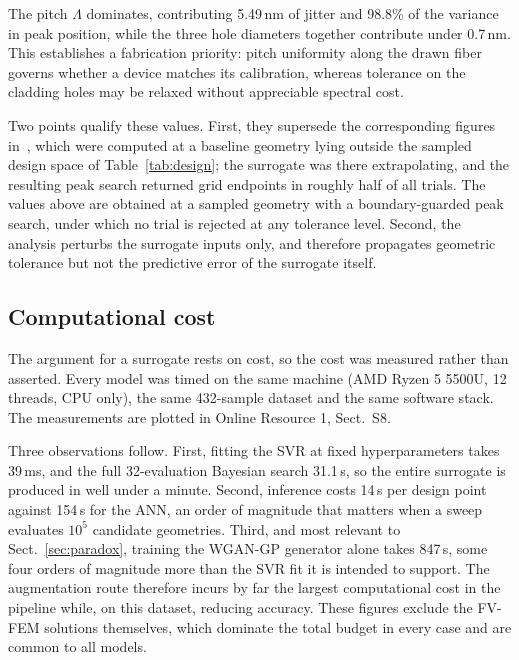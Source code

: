 \documentclass[iicol,pdflatex,sn-basic,Numbered]{sn-jnl}
\begin{document}
The pitch $\Lambda$ dominates, contributing 5.49\,nm of jitter and 98.8\% of
the variance in peak position, while the three hole diameters together
contribute under 0.7\,nm. This establishes a fabrication priority: pitch
uniformity along the drawn fiber governs whether a device matches its
calibration, whereas tolerance on the cladding holes may be relaxed without
appreciable spectral cost.

Two points qualify these values. First, they supersede the corresponding figures
in~\cite{hammoud2026siu}, which were computed at a baseline geometry lying
outside the sampled design space of Table~\ref{tab:design}; the surrogate was
there extrapolating, and the resulting peak search returned grid endpoints in
roughly half of all trials. The values above are obtained at a sampled geometry
with a boundary-guarded peak search, under which no trial is rejected at any
tolerance level. Second, the analysis perturbs the surrogate inputs only, and
therefore propagates geometric tolerance but not the predictive error of the
surrogate itself.

%

\subsection{Computational cost}\label{sec:timing}

The argument for a surrogate rests on cost, so the cost was measured rather than
asserted. Every model was timed on the same machine (AMD Ryzen 5 5500U, 12
threads, CPU only), the same 432-sample dataset and the same software stack.
The measurements are plotted in Online Resource 1, Sect.~S8.

Three observations follow. First, fitting the SVR at fixed hyperparameters takes
39\,ms, and the full 32-evaluation Bayesian search 31.1\,s, so the entire
surrogate is produced in well under a minute. Second, inference costs
14\,\textmu s per design point against 154\,\textmu s for the ANN, an order of
magnitude that matters when a sweep evaluates $10^{5}$ candidate geometries.
Third, and most relevant to Sect.~\ref{sec:paradox}, training the WGAN-GP
generator alone takes 847\,s, some four orders of magnitude more than the SVR
fit it is intended to support. The augmentation route therefore incurs by far
the largest computational cost in the pipeline while, on this dataset, reducing
accuracy. These figures exclude the FV-FEM solutions themselves, which dominate
the total budget in every case and are common to all models.
\end{document}
